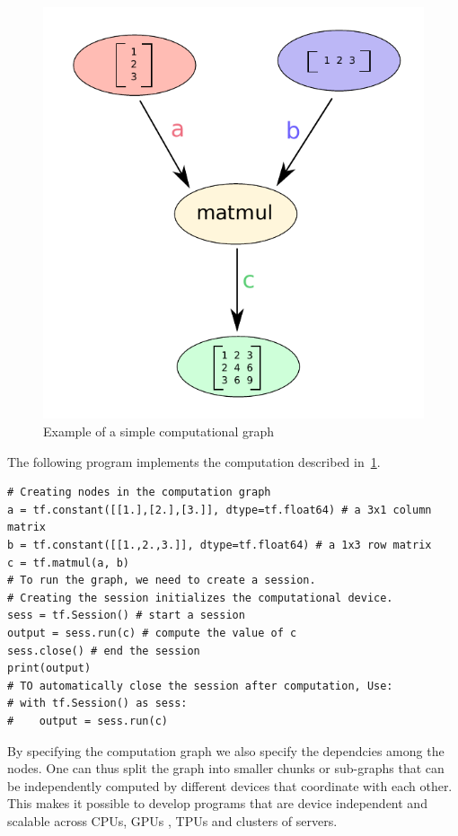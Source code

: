 \documentclass[10pt,letterpaper]{article}
\begin{document}
\begin{figure}[H]
\begin{center}
\includegraphics[scale=0.7]{Figures/fig6.pdf} 
\caption{Example of a simple computational graph}
\label{fig:compGraph}
\end{center}

\end{figure}
The following program implements the computation described in~\ref{fig:compGraph}.

\begin{verbatim}
# Creating nodes in the computation graph 
a = tf.constant([[1.],[2.],[3.]], dtype=tf.float64) # a 3x1 column matrix 
b = tf.constant([[1.,2.,3.]], dtype=tf.float64) # a 1x3 row matrix 
c = tf.matmul(a, b) 
# To run the graph, we need to create a session.
# Creating the session initializes the computational device.
sess = tf.Session() # start a session
output = sess.run(c) # compute the value of c
sess.close() # end the session
print(output)
# TO automatically close the session after computation, Use:
# with tf.Session() as sess:
#    output = sess.run(c) 
\end{verbatim}
By specifying the computation graph we also specify the dependcies among the nodes. One can thus split the graph into smaller chunks or sub-graphs that can be independently computed by different devices that coordinate with each other. This makes it possible to develop programs that are device independent and scalable across CPUs, GPUs , TPUs and clusters of servers. 
\end{document}
